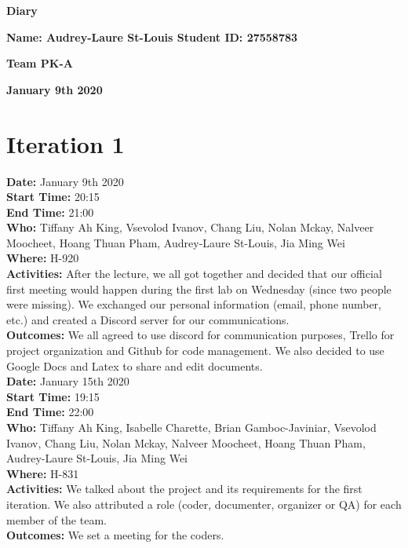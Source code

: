 \documentclass[12pt]{article}
\begin{document}
\vspace*{0.2in}
\centerline{\bf\Large Diary}

\vspace*{0.2in}
\centerline{\bf\Large Name: Audrey-Laure St-Louis   Student ID: 27558783}

\vspace*{0.2in}
\centerline{\bf\Large Team PK-A}

\vspace*{0.2in}
\centerline{\bf\Large January 9th 2020}

\section{Iteration 1}

{\bf Date:} January 9th 2020\\
{\bf Start Time:} 20:15\\
{\bf End Time:} 21:00 \\
{\bf Who:} Tiffany Ah King, Vsevolod Ivanov, Chang Liu, Nolan Mckay, Nalveer Moocheet, Hoang Thuan Pham, Audrey-Laure St-Louis, Jia Ming Wei\\
{\bf Where:} H-920  \\
{\bf Activities:} After the lecture, we all got together and decided that our official first meeting would happen during the first lab on Wednesday (since two people were missing). We exchanged our personal information (email, phone number, etc.) and created a Discord server for our communications. \\
{\bf Outcomes:} We all agreed to use discord for communication purposes, Trello for project organization and Github for code management. We also decided to use Google Docs and Latex to share and edit documents. \\

{\bf Date:} January 15th 2020\\
{\bf Start Time:} 19:15\\
{\bf End Time:} 22:00\\
{\bf Who:} Tiffany Ah King, Isabelle Charette, Brian Gamboc-Javiniar, Vsevolod Ivanov, Chang Liu, Nolan Mckay, Nalveer Moocheet, Hoang Thuan Pham, Audrey-Laure St-Louis, Jia Ming Wei\\
{\bf Where:} H-831\\
{\bf Activities:} We talked about the project and its requirements for the first iteration. We also attributed a role (coder, documenter, organizer or QA) for each member of the team.\\
{\bf Outcomes:} We set a meeting for the coders.\\
\end{document}

